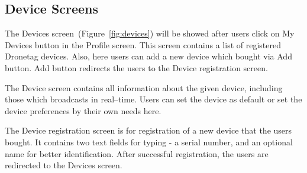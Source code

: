\subsection{Device Screens}\label{subsec:device-screens}
The Devices screen~(Figure~\ref{fig:devices}) will be showed after users click on My Devices button in the Profile screen.
This screen contains a list of registered Dronetag devices.
Also, here users can add a new device which bought via Add button.
Add button redirects the users to the Device registration screen.

The Device screen contains all information about the given device, including those which broadcasts in real--time.
Users can set the device as default or set the device preferences by their own needs here.

The Device registration screen is for registration of a new device that the users bought.
It contains two text fields for typing - a serial number, and an optional name for better identification.
After successful registration, the users are redirected to the Devices screen.
